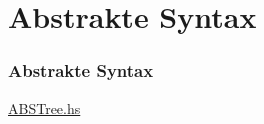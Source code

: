 \section{Abstrakte Syntax}

\begin{frame}
	\frametitle{Abstrakte Syntax}
	\begin{center}
		\Huge \href{run:../../project/src/ABSTree.hs}{ABSTree.hs}
	\end{center}
\end{frame}
